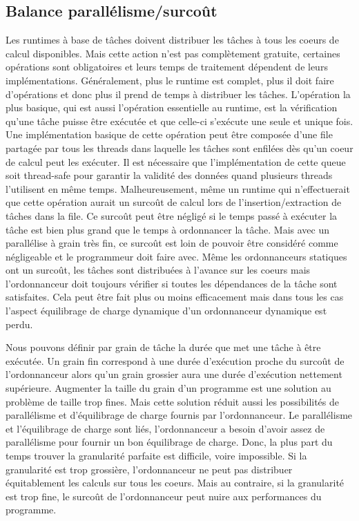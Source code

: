 \subsection{Balance parallélisme/surcoût}
Les runtimes à base de tâches doivent distribuer les tâches à tous les coeurs de calcul disponibles.
%
Mais cette action n'est pas complètement gratuite, certaines opérations sont obligatoires et leurs temps de traitement dépendent de leurs implémentations.
%
Généralement, plus le runtime est complet, plus il doit faire d'opérations et donc plus il prend de temps à distribuer les tâches.
%
L'opération la plus basique, qui est aussi l'opération essentielle au runtime, est la vérification qu'une tâche puisse être exécutée et que celle-ci s'exécute une seule et unique fois.
%
Une implémentation basique de cette opération peut être composée d'une file partagée par tous les threads dans laquelle les tâches sont enfilées dès qu'un coeur de calcul peut les exécuter.
%
Il est nécessaire que l'implémentation de cette queue soit thread-safe pour garantir la validité des données quand plusieurs threads l'utilisent en même temps.
%
Malheureusement, même un runtime qui n'effectuerait que cette opération aurait un surcoût de calcul lors de l'insertion/extraction de tâches dans la file.
%
Ce surcoût peut être négligé si le temps passé à exécuter la tâche est bien plus grand que le temps à ordonnancer la tâche.
%
Mais avec un parallélise à grain très fin, ce surcoût est loin de pouvoir être considéré comme négligeable et le programmeur doit faire avec.
%
Même les ordonnanceurs statiques ont un surcoût, les tâches sont distribuées à l'avance sur les coeurs mais l'ordonnanceur doit toujours vérifier si toutes les dépendances de la tâche sont satisfaites.
%
Cela peut être fait plus ou moins efficacement mais dans tous les cas l'aspect équilibrage de charge dynamique d'un ordonnanceur dynamique est perdu.


Nous pouvons définir par grain de tâche la durée que met une tâche à être exécutée.
%
Un grain fin correspond à une durée d'exécution proche du surcoût de l'ordonnanceur alors qu'un grain grossier aura une durée d'exécution nettement supérieure.
%
Augmenter la taille du grain d'un programme est une solution au problème de taille trop fines.
%
Mais cette solution réduit aussi les possibilités de parallélisme et d'équilibrage de charge fournis par l'ordonnanceur.
%
Le parallélisme et l'équilibrage de charge sont liés, l'ordonnanceur a besoin d'avoir assez de parallélisme pour fournir un bon équilibrage de charge.
%
Donc, la plus part du temps trouver la granularité parfaite est difficile, voire impossible.
%
Si la granularité est trop grossière, l'ordonnanceur ne peut pas distribuer équitablement les calculs sur tous les coeurs.
%
Mais au contraire, si la granularité est trop fine, le surcoût de l'ordonnanceur peut nuire aux performances du programme.


